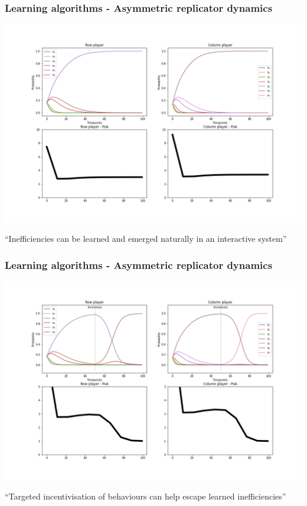 \begin{frame}
    \frametitle{Learning algorithms - Asymmetric replicator dynamics}

    \includegraphics[scale=0.28]{Bin/ARD_game.png}
    
\end{frame}

\begin{frame}
    \centering
    \Huge{
    ``Inefficiencies can be learned and emerged naturally in an interactive system''
    }
\end{frame}


\begin{frame}
    \frametitle{Learning algorithms - Asymmetric replicator dynamics}

    \includegraphics[scale=0.28]{Bin/ARD_penalty_game.png}
    
\end{frame}


\begin{frame}
    \centering
    \Huge{
    ``Targeted incentivisation of behaviours can help escape learned inefficiencies''
    }
\end{frame}
